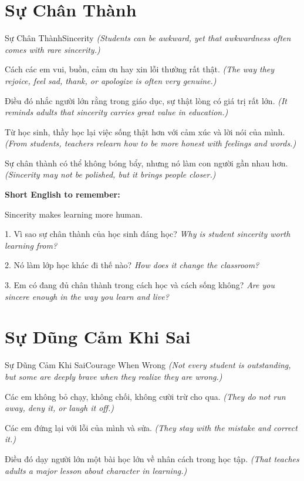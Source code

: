 \section{Sự Chân Thành}
\begin{truyen}{Sự Chân Thành}{Sincerity}
\textit{(Students can be awkward, yet that awkwardness often comes with rare sincerity.)}

Cách các em vui, buồn, cảm ơn hay xin lỗi thường rất thật.
\textit{(The way they rejoice, feel sad, thank, or apologize is often very genuine.)}

Điều đó nhắc người lớn rằng trong giáo dục, sự thật lòng có giá trị rất lớn.
\textit{(It reminds adults that sincerity carries great value in education.)}

Từ học sinh, thầy học lại việc sống thật hơn với cảm xúc và lời nói của mình.
\textit{(From students, teachers relearn how to be more honest with feelings and words.)}
\end{truyen}

\begin{baihoc}
Sự chân thành có thể không bóng bẩy, nhưng nó làm con người gần nhau hơn.
\textit{(Sincerity may not be polished, but it brings people closer.)}
\end{baihoc}

\begin{ghinhoanh}
\textbf{Short English to remember:}

Sincerity makes learning more human.

\end{ghinhoanh}

\begin{tuhocnhanh}
1. Vì sao sự chân thành của học sinh đáng học? \textit{Why is student sincerity worth learning from?}

2. Nó làm lớp học khác đi thế nào? \textit{How does it change the classroom?}

3. Em có đang đủ chân thành trong cách học và cách sống không? \textit{Are you sincere enough in the way you learn and live?}
\end{tuhocnhanh}
\ngancach

\section{Sự Dũng Cảm Khi Sai}
\begin{truyen}{Sự Dũng Cảm Khi Sai}{Courage When Wrong}
\textit{(Not every student is outstanding, but some are deeply brave when they realize they are wrong.)}

Các em không bỏ chạy, không chối, không cười trừ cho qua.
\textit{(They do not run away, deny it, or laugh it off.)}

Các em đứng lại với lỗi của mình và sửa.
\textit{(They stay with the mistake and correct it.)}

Điều đó dạy người lớn một bài học lớn về nhân cách trong học tập.
\textit{(That teaches adults a major lesson about character in learning.)}
\end{truyen}

